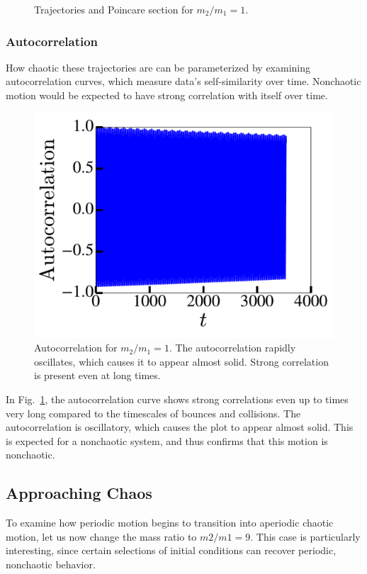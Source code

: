 \documentclass[pra,twocolumn,showpacs,amsmath,amssymb, aps, 10pt]{revtex4-1}
\begin{document}
\begin{figure}
  \caption{Trajectories and Poincare section for $m_2/m_1 = 1$.}
\end{figure}

\subsubsection{Autocorrelation}

How chaotic these trajectories are can be parameterized by examining autocorrelation
curves, which measure data's self-similarity over time. Nonchaotic motion would
be expected to have strong correlation with itself over time.


\begin{figure}
  \includegraphics[width=0.8\linewidth]{r1_0_acorr}
  \caption{Autocorrelation for $m_2/m_1 = 1$. The autocorrelation
  rapidly oscillates, which causes it to appear almost solid. Strong
  correlation is present even at long times.}
  \label{fig:1-acorr}
\end{figure}

In Fig.~\ref{fig:1-acorr}, the autocorrelation curve shows strong correlations
even up to times very long compared to the timescales of bounces and collisions.
The autocorrelation is oscillatory, which causes the plot to appear almost solid.
This is expected for a nonchaotic system, and thus confirms that this motion is nonchaotic.


\subsection{Approaching Chaos}\label{sec:partially_chaotic}

To examine how periodic motion begins to transition into aperiodic chaotic motion,
let us now change the mass ratio to $m2/m1 = 9$. This case is particularly
interesting, since certain selections
of initial conditions can recover periodic, nonchaotic behavior.
\end{document}
